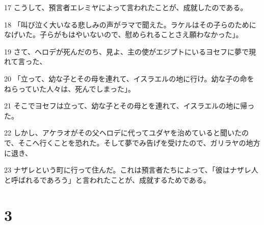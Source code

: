 \par 17 こうして、預言者エレミヤによって言われたことが、成就したのである。
\par 18 「叫び泣く大いなる悲しみの声がラマで聞えた。ラケルはその子らのためになげいた。子らがもはやいないので、慰められることさえ願わなかった」。
\par 19 さて、ヘロデが死んだのち、見よ、主の使がエジプトにいるヨセフに夢で現れて言った、
\par 20 「立って、幼な子とその母を連れて、イスラエルの地に行け。幼な子の命をねらっていた人々は、死んでしまった」。
\par 21 そこでヨセフは立って、幼な子とその母とを連れて、イスラエルの地に帰った。
\par 22 しかし、アケラオがその父ヘロデに代ってユダヤを治めていると聞いたので、そこへ行くことを恐れた。そして夢でみ告げを受けたので、ガリラヤの地方に退き、
\par 23 ナザレという町に行って住んだ。これは預言者たちによって、「彼はナザレ人と呼ばれるであろう」と言われたことが、成就するためである。

\chapter{3}

